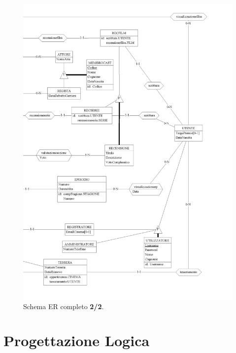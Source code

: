\documentclass[a4paper,12pt]{report}
\begin{document}
	\begin{figure}[H]
		\centering
		\includegraphics[width=430pt]{ER/ercompletodx.png}
		\caption{Schema ER completo \textbf{2/2}.}
	\end{figure}
	\chapter{Progettazione Logica}
\end{document}
